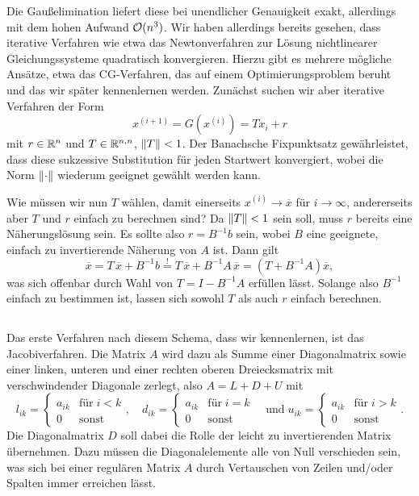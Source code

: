 Die Gaußelimination liefert diese bei unendlicher Genauigkeit exakt,
allerdings mit dem hohen Aufwand $\mathcal O(n^3)$. Wir haben allerdings
bereits gesehen, dass iterative Verfahren wie etwa das Newtonverfahren
zur Lösung nichtlinearer Gleichungssysteme quadratisch
konvergieren. Hierzu gibt es mehrere mögliche Ansätze, etwa das
CG-Verfahren, das auf einem Optimierungsproblem beruht und das wir
später kennenlernen werden. Zunächst suchen wir aber iterative
Verfahren der Form
\begin{equation}
  \label{eq:itgl}
  x^{(i+1)} = G(x^{(i)}) = T x_i + r
\end{equation}
mit $r\in\mathbb{R}^n$ und $T\in\mathbb{R}^{n,n}$, $\left\lVert{T}\right\rVert<1$. Der Banachsche
Fixpunktsatz gewährleistet, dass diese sukzessive Substitution für
jeden Startwert konvergiert, wobei die Norm $\left\lVert{\cdot}\right\rVert$ wiederum
geeignet gewählt werden kann.

Wie müssen wir nun $T$ wählen, damit einerseits $x^{(i)}\to \overline{x}$
für $i\to\infty$, andererseits aber $T$ und $r$ einfach zu berechnen
sind? Da $\left\lVert{T}\right\rVert < 1$ sein soll, muss $r$ bereits eine
Näherungslösung sein. Es sollte also $r = B^{-1}b$ sein, wobei $B$
eine geeignete, einfach zu invertierende Näherung von $A$ ist. Dann
gilt
\begin{equation}
  \overline{x} = T\,\overline{x} +
  B^{-1}b
  \stackrel{!}{=} T\,\overline{x} +
  B^{-1}A\,\overline{x}
  = \left(T + B^{-1}A\right)\overline{x},
\end{equation}
was sich offenbar durch Wahl von $T = I - B^{-1}A$ erfüllen
lässt. Solange also $B^{-1}$ einfach zu bestimmen ist, lassen sich
sowohl $T$ als auch $r$ einfach berechnen.

\subsection{}

Das erste Verfahren nach diesem Schema, dass wir kennenlernen, ist
das Jacobiverfahren. Die Matrix $A$ wird dazu als Summe einer
Diagonalmatrix sowie einer linken, unteren und einer rechten oberen
Dreiecksmatrix mit verschwindender Diagonale zerlegt, also $A = L + D
+ U$ mit
\begin{equation}
  l_{ik}=
  \begin{cases}
    a_{ik} & \text{für}\; i<k\\
    0 & \text{sonst}
  \end{cases},\quad
  d_{ik} =
  \begin{cases}
    a_{ik} & \text{für}\; i=k\\
    0 & \text{sonst}
  \end{cases}\quad\text{und}\;
  u_{ik} =
  \begin{cases}
    a_{ik} & \text{für}\; i>k\\
    0 & \text{sonst}
  \end{cases}.
\end{equation}
Die Diagonalmatrix $D$ soll dabei die Rolle der leicht zu
invertierenden Matrix übernehmen. Dazu müssen die Diagonalelemente
alle von Null verschieden sein, was sich bei einer regulären Matrix
$A$ durch Vertauschen von Zeilen und/oder Spalten immer erreichen
lässt.


